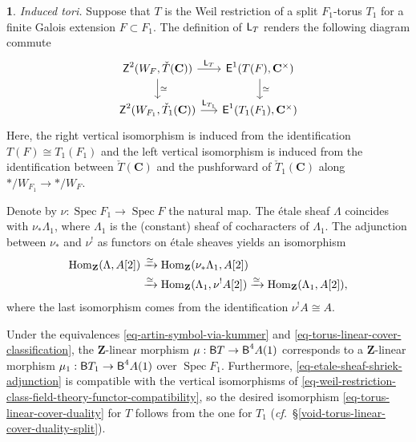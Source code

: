 \documentclass[10pt,english,reqno]{amsart}
\newcommand{\integers}{\mathbf Z}
\newcommand{\complexes}{\mathbf C}
\newcommand{\cycle}{\textnormal{\textsf{Z}}}
\newcommand{\extension}{\textnormal{\textsf{E}}}
\newcommand{\Hom}{\operatorname{Hom}}
\newcommand{\deloop}{\textnormal{\textsf{B}}}
\newcommand{\Spec}{\operatorname{Spec}}
\newcommand{\Langlands}{\textnormal{\textsf{L}}}
\theoremstyle{definition}
\numberwithin{equation}{section}
\newtheorem{untitledsubsubsection}[subsubsection]{}
\newenvironment{void}
{\begin{untitledsubsubsection}}
{\end{untitledsubsubsection}}
\begin{document}
\begin{void}\emph{Induced tori.}
Suppose that $T$ is the Weil restriction of a split $F_1$-torus $T_1$ for a finite Galois extension $F \subset F_1$. The definition of $\Langlands_T$ renders the following diagram commute
\begin{equation}
\label{eq-weil-restriction-class-field-theory-functor-compatibility}
\begin{tikzcd}[column sep = 1.5em]
	\cycle^2(W_F, \check T(\complexes)) \ar[r, "\Langlands_T"]\ar[d, "\simeq"] & \extension^1(T(F), \complexes^{\times}) \ar[d, "\simeq"] \\
	\cycle^2(W_{F_1}, \check T_1(\complexes)) \ar[r, "\Langlands_{T_1}"] & \extension^1(T_1(F_1), \complexes^{\times})
\end{tikzcd}
\end{equation}
Here, the right vertical isomorphism is induced from the identification $T(F) \cong T_1(F_1)$ and the left vertical isomorphism is induced from the identification between $\check T(\complexes)$ and the pushforward of $\check T_1(\complexes)$ along $*/W_{F_1} \rightarrow */W_F$.

Denote by $\nu : \Spec F_1 \rightarrow \Spec F$ the natural map. The \'etale sheaf $\Lambda$ coincides with $\nu_*\Lambda_1$, where $\Lambda_1$ is the (constant) sheaf of cocharacters of $\Lambda_1$. The adjunction between $\nu_*$ and $\nu^!$ as functors on \'etale sheaves yields an isomorphism
\begin{align}
\notag
\Hom_{\integers}(\Lambda, A[2]) &\xrightarrow{\simeq} \Hom_{\integers}(\nu_*\Lambda_1, A[2]) \\
\label{eq-etale-sheaf-shriek-adjunction}
& \xrightarrow{\simeq} \Hom_{\integers}(\Lambda_1, \nu^!A[2]) \xrightarrow{\simeq} \Hom_{\integers}(\Lambda_1, A[2]),
\end{align}
where the last isomorphism comes from the identification $\nu^!A \cong A$.

Under the equivalences \eqref{eq-artin-symbol-via-kummer} and \eqref{eq-torus-linear-cover-classification}, the $\integers$-linear morphism $\mu : \deloop T \rightarrow \deloop^4 A(1)$ corresponds to a $\integers$-linear morphism $\mu_1 : \deloop T_1 \rightarrow \deloop^4A(1)$ over $\Spec F_1$. Furthermore, \eqref{eq-etale-sheaf-shriek-adjunction} is compatible with the vertical isomorphisms of \eqref{eq-weil-restriction-class-field-theory-functor-compatibility}, so the desired isomorphism \eqref{eq-torus-linear-cover-duality} for $T$ follows from the one for $T_1$ (\emph{cf.}~\S\ref{void-torus-linear-cover-duality-split}).
\end{void}
\end{document}
